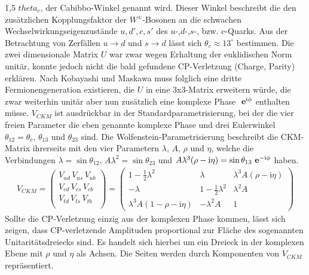 \documentclass[11pt,a4paper,twoside]{report}
\begin{document}
\begin{spacing}{1,5}
$theta_c$, der Cabibbo-Winkel genannt wird. Dieser Winkel beschreibt die den zusätzlichen Kopplungsfaktor der $W^\pm$-Bosonen an die schwachen 
Wechselwirkungseigenzustände $u, d', c, s'$ des $u$-,$d$-,$s$-, bzw. $c$-Quarks. Aus der Betrachtung von Zerfällen $u\rightarrow d$ und $s\rightarrow d$ lässt
sich $\theta_c \approx 13^\circ$ bestimmen. Die zwei dimensionale Matrix $U$ war zwar wegen Erhaltung der euklidischen Norm unitär, konnte jedoch nicht die 
bald gefundene CP-Verletzung (Charge, Parity) erklären. Nach Kobayashi und Maskawa muss folglich eine dritte Fermionengeneration existieren,
die $U$ in eine 3x3-Matrix erweitern würde, die zwar weiterhin unitär aber nun zusätzlich eine komplexe Phase $\ \mathbf{e}^{\text{i}\phi}$ enthalten müsse. $V_{CKM}$ ist
ausdrückbar in der Standardparametrisierung, bei der die vier freien Parameter die eben genannte komplexe Phase und drei Eulerwinkel 
$\theta_{12} = \theta_c,\, \theta_{13}$ und $\theta_{23}$ sind. Die Wolfenstein-Parametrisierung beschreibt die CKM-Matrix ihrerseits mit den vier Parametern
$\lambda,\, A,\, \rho$ und $\eta$, welche die Verbindungen $\lambda = \sin\theta_{12},\, A\lambda^2 = \sin\theta_{23}$ und $A\lambda^3(\rho-\text{i}\eta) = \sin\theta_{13}\ \mathbf{e}^{-\text{i}\phi}$
haben.
\begin{align}
 V_{CKM} = \begin{pmatrix}
            V_{ud}\,V_{us}\,V_{ub}\\
            V_{cd}\,V_{cs}\,V_{cb}\\
            V_{td}\,V_{ts}\,V_{tb}\\
           \end{pmatrix} = \begin{pmatrix}
			    1-\frac12\lambda^2 & \lambda & \lambda^3A(\rho-\text{i}\eta)\\
			    -\lambda & 1-\frac12 \lambda^2 &\lambda^2A\\
			    \lambda^3A(1-\rho-\text{i}\eta) &-\lambda^2A & 1
			    \end{pmatrix}
\end{align}
Sollte die CP-Verletzung einzig aus der komplexen Phase kommen, lässt sich zeigen, dass CP-verletzende Amplituden proportional zur Fläche des sogenannten
Unitaritätsdreiecks sind. Es handelt sich hierbei um ein Dreieck in der komplexen Ebene mit $\rho$ und $\eta$ als Achsen. Die Seiten werden durch Komponenten
von $V_{CKM}$ repräsentiert.


\end{spacing}
\end{document}
